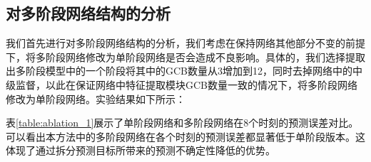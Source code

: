 \subsection{对多阶段网络结构的分析}
我们首先进行对多阶段网络结构的分析，我们考虑在保持网络其他部分不变的前提下，将多阶段网络修改为单阶段网络是否会造成不良影响。具体的，我们选择提取出多阶段模型中的一个阶段将其中的GCB数量从3增加到12，同时去掉网络中的中级监督，以此在保证网络中特征提取模块GCB数量一致的情况下，将多阶段网络修改为单阶段网络。实验结果如下所示：

\begin{table}[h]
    \begin{center}
    \end{center}
    \caption{单阶段网络与多阶段网络对比}
    \label{table:ablation_1}
    \end{table}

表\ref{table:ablation_1}展示了单阶段网络和多阶段网络在8个时刻的预测误差对比。可以看出本方法中的多阶段网络在各个时刻的预测误差都显著低于单阶段版本。这体现了通过拆分预测目标所带来的预测不确定性降低的优势。

